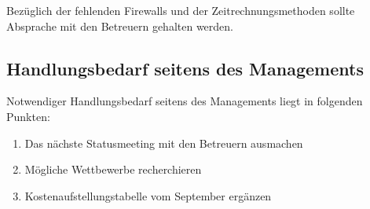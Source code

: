 \documentclass[
	headings=optiontotocandhead,%
	oneside,
	numbers=noenddot,%
	toc=flat, %
	10pt, %
	parskip=full, %
	listof=totoc, %
	listof=flat, %
	numbers=noenddot, %
	bibliography=totoc, %
	a4paper,DIV=14,
]{scrartcl}
\begin{document}
Bezüglich der fehlenden Firewalls und der Zeitrechnungsmethoden sollte Absprache mit den Betreuern gehalten werden.

\subsection{Handlungsbedarf seitens des Managements}
Notwendiger Handlungsbedarf seitens des Managements liegt in folgenden Punkten:

\begin{enumerate}
	\item Das nächste Statusmeeting mit den Betreuern ausmachen
	\item Mögliche Wettbewerbe recherchieren
	\item Kostenaufstellungstabelle vom September ergänzen
\end{enumerate}

\clearpage
\end{document}
